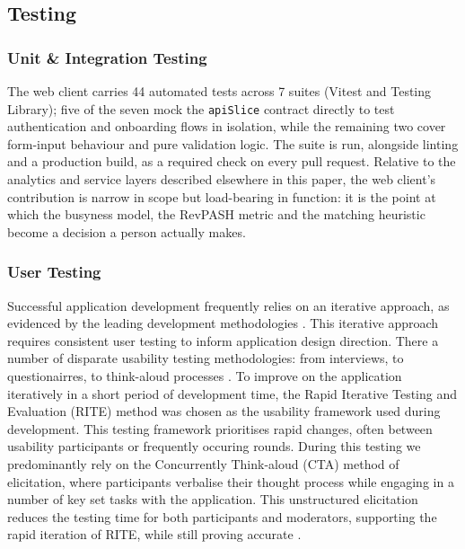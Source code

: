 \documentclass[conference]{IEEEtran}
\begin{document}
\subsection{Testing}
\subsubsection{Unit \& Integration Testing}
The web client carries 44 automated tests across 7 suites (Vitest and Testing Library); five of the seven mock the \texttt{apiSlice} contract directly to test authentication and onboarding flows in isolation, while the remaining two cover form-input behaviour and pure validation logic. The suite is run, alongside linting and a production build, as a required check on every pull request. Relative to the analytics and service layers described elsewhere in this paper, the web client's contribution is narrow in scope but load-bearing in function: it is the point at which the busyness model, the RevPASH metric and the matching heuristic become a decision a person actually makes.

\subsubsection{User Testing}

Successful application development frequently relies on an iterative approach, as evidenced by the leading development methodologies \cite{beck2001manifesto}. This iterative approach requires consistent user testing to inform application design direction. There a number of disparate usability testing methodologies: from interviews, to questionairres, to think-aloud processes \cite{weichbroth2020usability}.  To improve on the application iteratively in a short period of development time, the Rapid Iterative Testing and Evaluation (RITE) \cite{medlock2002using} method was chosen as the usability framework used during development. This testing framework prioritises rapid changes, often between usability participants or frequently occuring rounds. During this testing we predominantly rely on the Concurrently Think-aloud (CTA) \cite{ericsson1984protocol} method of elicitation, where participants verbalise their thought process while engaging in a number of key set tasks with the application. This unstructured elicitation reduces the testing time for both participants and moderators, supporting the rapid iteration of RITE, while still proving accurate \cite{cooke2010assessing}.
\end{document}
